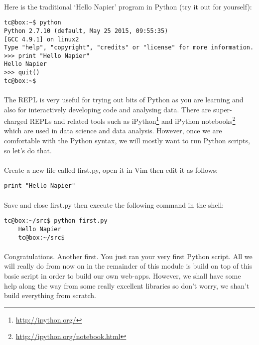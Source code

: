 \documentclass[12pt, a4paper, twoside]{book}
\begin{document}
\paragraph{} Here is the traditional `Hello Napier' program in Python (try it out for yourself):

\begin{lstlisting}[style=DOS]
tc@box:~$ python
Python 2.7.10 (default, May 25 2015, 09:55:35) 
[GCC 4.9.1] on linux2
Type "help", "copyright", "credits" or "license" for more information.
>>> print "Hello Napier"
Hello Napier
>>> quit()
tc@box:~$
\end{lstlisting}

\paragraph{} The REPL is very useful for trying out bits of Python as you are learning and also for interactively developing code and analysing data. There are super-charged REPLs and related tools such as iPython\footnote{\url{http://ipython.org/}} and iPython notebooks\footnote{\url{http://ipython.org/notebook.html}} which are used in data science and data analysis. However, once we are comfortable with the Python syntax, we will mostly want to run Python scripts, so let's do that.

\paragraph{} Create a new file called first.py, open it in Vim then edit it as follows:

\begin{lstlisting}
print "Hello Napier"
\end{lstlisting}

\paragraph{} Save and close first.py then execute the following command in the shell:

\begin{lstlisting}[style=DOS]
    tc@box:~/src$ python first.py 
    Hello Napier
    tc@box:~/src$
\end{lstlisting}

\paragraph{} Congratulations. Another first. You just ran your very first Python script. All we will really do from now on in the remainder of this module is build on top of this basic script in order to build our own web-apps. However, we shall have some help along the way from some really excellent libraries so don't worry, we shan't build everything from scratch.
\end{document}
